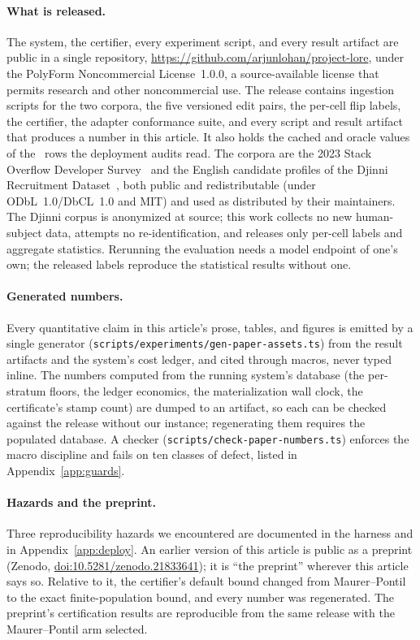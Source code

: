\paragraph{What is released.} The system, the certifier, every
experiment script, and every result artifact are public in a single
repository, \mbox{\url{https://github.com/arjunlohan/project-lore}},
under the PolyForm Noncommercial License~1.0.0, a source-available
license that permits research and other noncommercial use. The release
contains ingestion scripts for the two corpora, the five versioned edit
pairs, the per-cell flip labels, the certifier, the adapter conformance
suite, and every script and result artifact that produces a number in
this article. It also holds the cached and oracle values of the
\auditCellRows\ rows the deployment audits read. The corpora are the
2023 Stack Overflow Developer Survey~\cite{sosurvey} and the English
candidate profiles of the Djinni Recruitment Dataset~\cite{djinni}, both
public and redistributable (under ODbL~1.0/DbCL~1.0 and MIT) and used as
distributed by their maintainers. The Djinni corpus is anonymized at
source; this work collects no new human-subject data, attempts no
re-identification, and releases only per-cell labels and aggregate
statistics. Rerunning the evaluation needs a model endpoint of one's
own; the released labels reproduce the statistical results without one.

\keeprunin
\paragraph{Generated numbers.} Every quantitative claim in this
article's prose, tables, and figures is emitted by a single generator
(\texttt{scripts/experiments/gen-paper-assets.ts}) from the result
artifacts and the system's cost ledger, and cited through macros, never
typed inline. The numbers computed from the running system's database
(the per-stratum floors, the ledger economics, the materialization wall
clock, the certificate's stamp count) are dumped to an artifact, so each
can be checked against the release without our instance; regenerating
them requires the populated database. A checker
(\texttt{scripts/check-paper-numbers.ts}) enforces the macro discipline
and fails on ten classes of defect, listed in Appendix~\ref{app:guards}.

\keeprunin
\paragraph{Hazards and the preprint.} Three reproducibility hazards we
encountered are documented in the harness and in Appendix~\ref{app:deploy}. An
earlier version of this article is public as a preprint (Zenodo,
\href{https://doi.org/10.5281/zenodo.21833641}{doi:10.5281/zenodo.21833641});
it is ``the preprint'' wherever this article says so. Relative to it,
the certifier's default bound changed from Maurer--Pontil to the exact
finite-population bound, and every number was regenerated. The
preprint's certification results are reproducible from the same release
with the Maurer--Pontil arm selected.
\FloatBarrier
